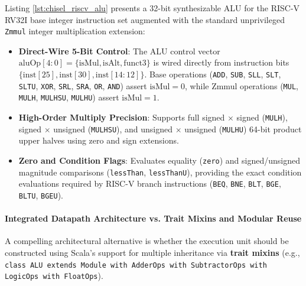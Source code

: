 {Listing \ref{lst:chisel_riscv_alu} presents a 32-bit synthesizable ALU for the RISC-V RV32I base integer instruction set augmented with the standard unprivileged \texttt{Zmmul} integer multiplication extension:
\begin{itemize}
    \item \textbf{Direct-Wire 5-Bit Control}: The ALU control vector $\text{aluOp}[4:0] = \{\text{isMul}, \text{isAlt}, \text{funct3}\}$ is wired directly from instruction bits $\{\text{inst}[25], \text{inst}[30], \text{inst}[14:12]\}$. Base operations (\texttt{ADD}, \texttt{SUB}, \texttt{SLL}, \texttt{SLT}, \texttt{SLTU}, \texttt{XOR}, \texttt{SRL}, \texttt{SRA}, \texttt{OR}, \texttt{AND}) assert $\text{isMul} = 0$, while Zmmul operations (\texttt{MUL}, \texttt{MULH}, \texttt{MULHSU}, \texttt{MULHU}) assert $\text{isMul} = 1$.
    \item \textbf{High-Order Multiply Precision}: Supports full signed $\times$ signed (\texttt{MULH}), signed $\times$ unsigned (\texttt{MULHSU}), and unsigned $\times$ unsigned (\texttt{MULHU}) 64-bit product upper halves using zero and sign extensions.
    \item \textbf{Zero and Condition Flags}: Evaluates equality (\texttt{zero}) and signed/unsigned magnitude comparisons (\texttt{lessThan}, \texttt{lessThanU}), providing the exact condition evaluations required by RISC-V branch instructions (\texttt{BEQ}, \texttt{BNE}, \texttt{BLT}, \texttt{BGE}, \texttt{BLTU}, \texttt{BGEU}).
\end{itemize}

\paragraph{Integrated Datapath Architecture vs. Trait Mixins and Modular Reuse}
A compelling architectural alternative is whether the execution unit should be constructed using Scala's support for multiple inheritance via \textbf{trait mixins} (e.g., \texttt{class ALU extends Module with AdderOps with SubtractorOps with LogicOps with FloatOps}).

}
